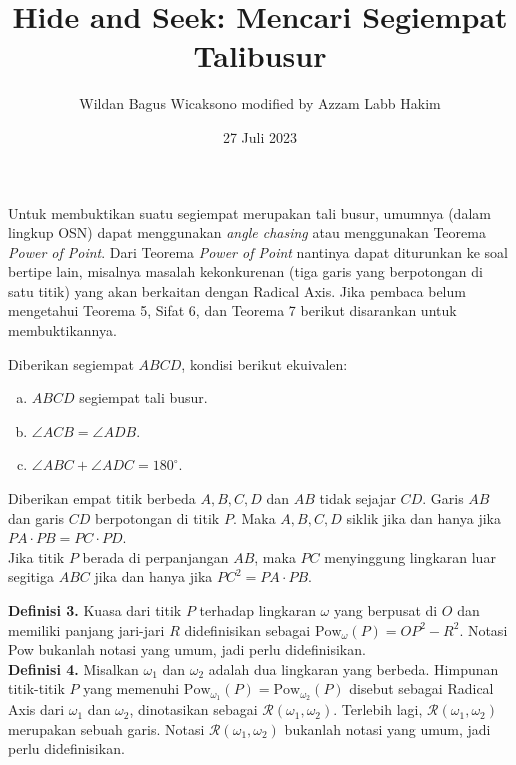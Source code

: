 \documentclass[12pt]{scrartcl}
\title{\textbf{Hide and Seek: Mencari Segiempat Talibusur}}
\author{Wildan Bagus Wicaksono modified by Azzam Labb Hakim}
\date{27 Juli 2023}
\begin{document}
\maketitle

\renewcommand*\contentsname{Daftar Isi}
\tableofcontents

\newpage

Untuk membuktikan suatu segiempat merupakan tali busur, umumnya (dalam lingkup OSN) dapat menggunakan \textit{angle chasing} atau menggunakan Teorema \textit{Power of Point}. Dari Teorema \textit{Power of Point} nantinya dapat diturunkan ke soal bertipe lain, misalnya masalah kekonkurenan (tiga garis yang berpotongan di satu titik) yang akan berkaitan dengan Radical Axis. Jika pembaca belum mengetahui Teorema 5, Sifat 6, dan Teorema 7 berikut disarankan untuk membuktikannya.
\begin{tcolorbox}[colback=blue!5!white,colframe=blue!75!black,title=\textbf{Teorema 1}]
  Diberikan segiempat $ABCD$, kondisi berikut ekuivalen:
\begin{enumerate}[(a).]
\item $ABCD$ segiempat tali busur.
\item $\angle ACB=\angle ADB$.
\item $\angle ABC+\angle ADC=180^\circ$.
\end{enumerate}
\end{tcolorbox}
\begin{tcolorbox}[colback=blue!5!white,colframe=blue!75!black,title=\textbf{Teorema 2: Power of Point Theorem}]
 Diberikan empat titik berbeda $A,B,C,D$ dan $AB$ tidak sejajar $CD$. Garis $AB$ dan garis $CD$ berpotongan di titik $P$. Maka $A,B,C,D$ siklik jika dan hanya jika $PA\cdot PB=PC\cdot PD$.\\
Jika titik $P$ berada di perpanjangan $AB$, maka $PC$ menyinggung lingkaran luar segitiga $ABC$ jika dan hanya jika $PC^2=PA\cdot PB$.
\end{tcolorbox}
\noindent\textbf{Definisi 3.} Kuasa dari titik $P$ terhadap lingkaran $\omega$ yang berpusat di $O$ dan memiliki panjang jari-jari $R$ didefinisikan sebagai $\text{Pow}_\omega(P)=OP^2-R^2$. Notasi Pow bukanlah notasi yang umum, jadi perlu didefinisikan.\\
\textbf{Definisi 4.} Misalkan $\omega_1$ dan $\omega_2$ adalah dua lingkaran yang berbeda. Himpunan titik-titik $P$ yang memenuhi $\text{Pow}_{\omega_1}(P)=\text{Pow}_{\omega_2}(P)$ disebut sebagai Radical Axis dari $\omega_1$ dan $\omega_2$, dinotasikan sebagai $\mathcal{R}(\omega_1,\omega_2)$. Terlebih lagi, $\mathcal{R}(\omega_1,\omega_2)$ merupakan sebuah garis. Notasi $\mathcal{R}(\omega_1,\omega_2)$ bukanlah notasi yang umum, jadi perlu didefinisikan.
\end{document}

